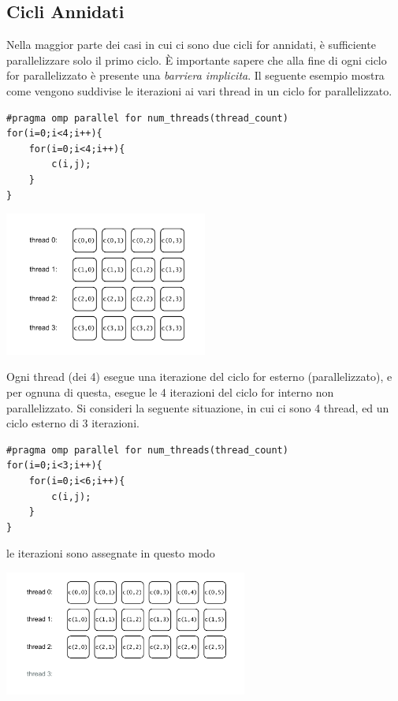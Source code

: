 \documentclass[10pt, letterpaper]{report}
\begin{document}
\subsection{Cicli Annidati}
Nella maggior parte dei casi in cui ci sono due cicli for annidati, è sufficiente parallelizzare solo il primo ciclo. È importante sapere che alla fine di ogni ciclo for parallelizzato è presente una \textit{barriera implicita}. Il seguente esempio mostra come vengono suddivise le iterazioni ai vari thread in un ciclo for parallelizzato.
\begin{lstlisting}[style=CStyle]
#pragma omp parallel for num_threads(thread_count) 
for(i=0;i<4;i++){
    for(i=0;i<4;i++){
        c(i,j);
    }
}
\end{lstlisting}
\begin{center}
    \includegraphics[width=0.5\textwidth ]{images/cicliAnnidati.drawio.pdf}
\end{center}
Ogni thread (dei 4) esegue una iterazione del ciclo for esterno (parallelizzato), e per ognuna di questa, esegue le 4 iterazioni del ciclo for interno non parallelizzato. Si consideri la seguente situazione, in cui ci sono 4 thread, ed un ciclo esterno di 3 iterazioni.
\begin{lstlisting}[style=CStyle]
#pragma omp parallel for num_threads(thread_count) 
for(i=0;i<3;i++){
    for(i=0;i<6;i++){
        c(i,j);
    }
}
\end{lstlisting}
le iterazioni sono assegnate in questo modo
    \begin{center}
        \includegraphics[width=0.6\textwidth ]{images/cicliAnnidati2.drawio.pdf}
    \end{center}
\end{document}
